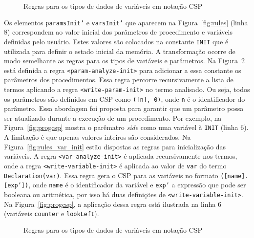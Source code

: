 \begin{figure}[!h]
\centering
\caption{Regras para os tipos de dados de variáveis em notação CSP}

\label{fig:rules_var_type}
\end{figure}


Os elementos \texttt{paramsInit'} e \texttt{varsInit'} que aparecem na Figura~\ref{fig:rules} (linha 8) correspondem ao valor inicial dos parâmetros de procedimento e variáveis definidas pelo usuário. Estes valores são colocados na constante \texttt{INIT} que é utilizada para definir o estado inicial da memória. A transformação ocorre de modo semelhante as regras para os tipos de variáveis e parâmetros. Na Figura~\ref{fig:rules_proc_init} está definida a regra \texttt{<param-analyze-init>} para adicionar a essa constante os parâmetros dos procedimentos. Essa regra percorre recursivamente a lista de termos aplicando a regra \texttt{<write-param-init>} no termo analisado. Ou seja, todos os parâmetros são definidos em CSP como \texttt{([n], 0)}, onde \texttt{n} é o identificador do parâmetro. Essa abordagem foi proposta para garantir que um parâmetro possa ser atualizado durante a execução de um procedimento. Por exemplo, na Figura~\ref{fig:progcsp} mostra o parêmatro \textit{side} como uma variável à \texttt{INIT} (linha 6). A limitação é que apenas valores inteiros são considerados. Na Figura~\ref{fig:rules_var_init} estão dispostas as regras para inicialização das variáveis. A regra \texttt{<var-analyze-init>} é aplicada recursivamente nos termos, onde a regra \texttt{<write-variable-init>} é aplicada ao valor de \texttt{var} do termo \texttt{Declaration(var)}. Essa regra gera o CSP para as variáveis no formato \texttt{([name].[exp'])}, onde \texttt{name} é o identificador da variável e \texttt{exp'} a expressão que pode ser booleana ou aritmética, por isso há duas definições de \texttt{<write-variable-init>}. Na Figura~\ref{fig:progcsp}, a aplicação dessa regra está ilustrada na linha 6 (variáveis \texttt{counter} e \texttt{lookLeft}).

\begin{figure}[!h]
\centering
\caption{Regras para os tipos de dados de variáveis em notação CSP}

\label{fig:rules_proc_init}
\end{figure}

